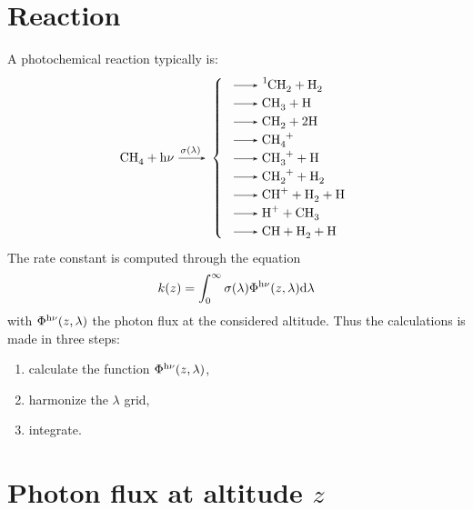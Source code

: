 \section{Reaction}
A photochemical reaction typically is:
\begin{equation}
\renewcommand{\arraystretch}{1.2}
\ce{CH4 + \h{\nu} ->[\sigma(\lambda)]}\left\{\begin{array}{l}
                    \ce{-> ^1CH2 + H2} \\
                    \ce{-> CH3 + H}\\
                    \ce{-> CH2 + 2 H}\\
                    \ce{-> CH4+}\\
                    \ce{-> CH3+ + H}\\
                    \ce{-> CH2+ + H2}\\
                    \ce{-> CH+ + H2 + H}\\
                    \ce{-> H+ + CH3}\\
                    \ce{-> CH + H2 + H}\\
                    \end{array}\right.
\end{equation}
The rate constant is computed through the equation
\begin{equation}
k(z) = \int_0^\infty \sigma(\lambda)\Phi^{\mathrm{h}\nu}(z,\lambda)\mathrm{d}\lambda
\end{equation}
with $\Phi^{\mathrm{h}\nu}(z,\lambda)$ the photon flux at the considered altitude.
Thus the calculations is made in three steps:
\begin{enumerate}
\item calculate the function $\Phi^{\mathrm{h}\nu}(z,\lambda)$,
\item harmonize the $\lambda$ grid,
\item integrate.
\end{enumerate}

\section{Photon flux at altitude \texorpdfstring{$z$}{z}}

